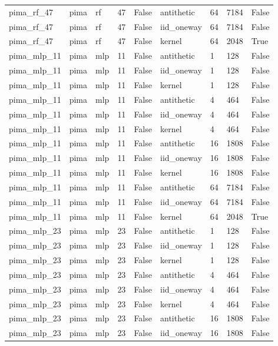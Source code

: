 \begin{tabular}{lllllllll}
pima\_rf\_47 & pima & rf & 47 & False & antithetic & 64 & 7184 & False \\
pima\_rf\_47 & pima & rf & 47 & False & iid\_oneway & 64 & 7184 & False \\
pima\_rf\_47 & pima & rf & 47 & False & kernel & 64 & 2048 & True \\
pima\_mlp\_11 & pima & mlp & 11 & False & antithetic & 1 & 128 & False \\
pima\_mlp\_11 & pima & mlp & 11 & False & iid\_oneway & 1 & 128 & False \\
pima\_mlp\_11 & pima & mlp & 11 & False & kernel & 1 & 128 & False \\
pima\_mlp\_11 & pima & mlp & 11 & False & antithetic & 4 & 464 & False \\
pima\_mlp\_11 & pima & mlp & 11 & False & iid\_oneway & 4 & 464 & False \\
pima\_mlp\_11 & pima & mlp & 11 & False & kernel & 4 & 464 & False \\
pima\_mlp\_11 & pima & mlp & 11 & False & antithetic & 16 & 1808 & False \\
pima\_mlp\_11 & pima & mlp & 11 & False & iid\_oneway & 16 & 1808 & False \\
pima\_mlp\_11 & pima & mlp & 11 & False & kernel & 16 & 1808 & False \\
pima\_mlp\_11 & pima & mlp & 11 & False & antithetic & 64 & 7184 & False \\
pima\_mlp\_11 & pima & mlp & 11 & False & iid\_oneway & 64 & 7184 & False \\
pima\_mlp\_11 & pima & mlp & 11 & False & kernel & 64 & 2048 & True \\
pima\_mlp\_23 & pima & mlp & 23 & False & antithetic & 1 & 128 & False \\
pima\_mlp\_23 & pima & mlp & 23 & False & iid\_oneway & 1 & 128 & False \\
pima\_mlp\_23 & pima & mlp & 23 & False & kernel & 1 & 128 & False \\
pima\_mlp\_23 & pima & mlp & 23 & False & antithetic & 4 & 464 & False \\
pima\_mlp\_23 & pima & mlp & 23 & False & iid\_oneway & 4 & 464 & False \\
pima\_mlp\_23 & pima & mlp & 23 & False & kernel & 4 & 464 & False \\
pima\_mlp\_23 & pima & mlp & 23 & False & antithetic & 16 & 1808 & False \\
pima\_mlp\_23 & pima & mlp & 23 & False & iid\_oneway & 16 & 1808 & False \\

\end{tabular}
